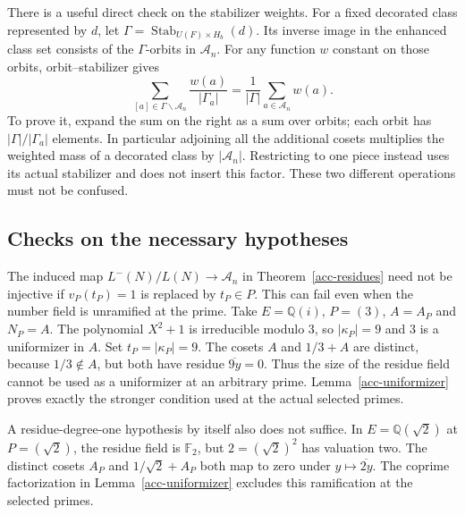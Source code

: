 There is a useful direct check on the stabilizer weights.
For a fixed decorated class represented by $d$, let
$\Gamma=\operatorname{Stab}_{U(F)\times H_b}(d)$.
Its inverse image in the enhanced class set consists of the
$\Gamma$-orbits in $\mathcal A_n$.
For any function $w$ constant on those orbits, orbit--stabilizer gives
\begin{equation}\label{acc-weighted-fiber}
 \sum_{[a]\in\Gamma\backslash\mathcal A_n}
           \frac{w(a)}{|\Gamma_a|}
      =\frac1{|\Gamma|}\sum_{a\in\mathcal A_n}w(a).
\end{equation}
To prove it, expand the sum on the right as a sum over orbits;
each orbit has $|\Gamma|/|\Gamma_a|$ elements.
In particular adjoining all the additional cosets multiplies the
weighted mass of a decorated class by $|\mathcal A_n|$.
Restricting to one piece instead uses its actual stabilizer and does
not insert this factor.  These two different operations must not be
confused.

\subsection{Checks on the necessary hypotheses}

\begin{example}\label{acc-norm-counterexample}
The induced map $L^-(N)/L(N)\to\mathcal A_n$ in
Theorem~\ref{acc-residues} need not be injective if
$v_P(t_P)=1$ is replaced by $t_P\in P$.
This can fail even when the number field is unramified at the prime.
Take $E=\mathbb Q(i)$, $P=(3)$, $A=A_P$ and $N_P=A$.
The polynomial $X^2+1$ is irreducible modulo $3$, so
$|\kappa_P|=9$ and $3$ is a uniformizer in $A$.
Set $t_P=|\kappa_P|=9$.
The cosets $A$ and $1/3+A$ are distinct, because $1/3\notin A$,
but both have residue $\overline{9y}=0$.
Thus the size of the residue field cannot be used as a uniformizer
at an arbitrary prime.  Lemma~\ref{acc-uniformizer} proves exactly
the stronger condition used at the actual selected primes.
\end{example}

\begin{example}\label{acc-ramified-counterexample}
A residue-degree-one hypothesis by itself also does not suffice.
In $E=\mathbb Q(\sqrt2)$ at $P=(\sqrt2)$, the residue field is
$\mathbb F_2$, but $2=(\sqrt2)^2$ has valuation two.
The distinct cosets $A_P$ and $1/\sqrt2+A_P$ both map to zero
under $y\mapsto\overline{2y}$.
The coprime factorization in Lemma~\ref{acc-uniformizer}
excludes this ramification at the selected primes.
\end{example}

